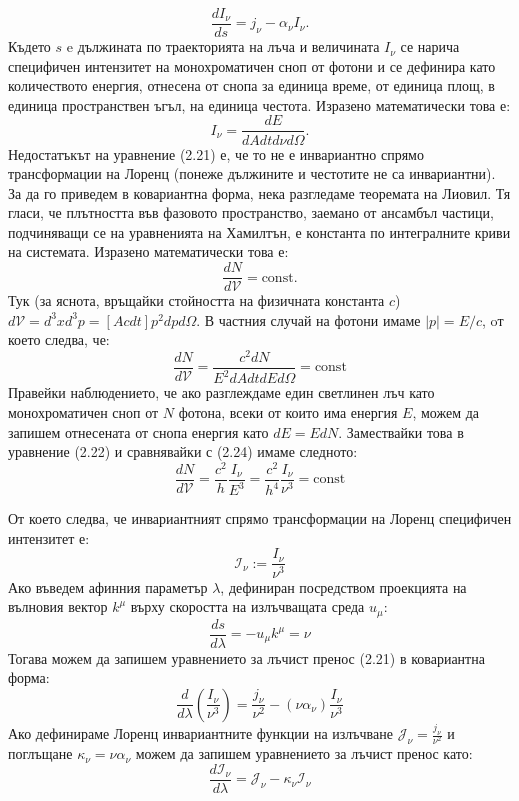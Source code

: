 \begin{equation}
	\frac{dI_\nu}{ds} = j_\nu - \alpha_\nu I_\nu.
\end{equation}
Където $s$ e дължината по траекторията на лъча и величината $I_\nu$ се нарича специфичен интензитет на монохроматичен сноп от фотони и се дефинира като количеството енергия, отнесена от снопа за единица време, от единица площ, в единица пространствен ъгъл, на единица честота. Изразено математически това е:
\begin{equation}
	I_\nu = \frac{dE}{dAdtd\nu d\Omega}.
\end{equation}
Недостатъкът на уравнение (2.21) е, че то не е инвариантно спрямо трансформации на Лоренц (понеже дължините и честотите не са инвариантни). За да го приведем в ковариантна форма, нека разгледаме теоремата на Лиовил. Тя гласи, че плътността във фазовото пространство, заемано от ансамбъл частици, подчиняващи се на уравненията на Хамилтън, е константа по интегралните криви на системата. Изразено математически това е:
\begin{equation}
	\frac{dN}{d\mathcal{V}} = \text{const}.
\end{equation}
Тук (за яснота, връщайки стойността на физичната константа $c$) $d\mathcal{V} = d^3x d^3p = \left[A cdt\right] p^2dpd\Omega$. В частния случай на фотони имаме $|p| = E / c$, oт което следва, че:
\begin{equation}
	\frac{dN}{d\mathcal{V}} = \frac{c^2dN}{E^2dAdtdEd\Omega} = \text{const}
\end{equation}
Правейки наблюдението, че ако разглеждаме един светлинен лъч като монохроматичен сноп от $N$ фотона, всеки от които има енергия $E$, можем да запишем отнесената от снопа енергия като $dE = EdN$. Замествайки това в уравнение (2.22) и сравнявайки с (2.24) имаме следното:
\begin{equation}
	\frac{dN}{d\mathcal{V}} = \frac{c^2}{h}\frac{I_\nu}{E^3} = \frac{c^2}{h^4}\frac{I_\nu}{\nu^3} = \text{const}
\end{equation}

От което следва, че инвариантният спрямо трансформации на Лоренц специфичен интензитет е:
\begin{equation}
	\mathcal{I}_\nu := \frac{I_\nu}{\nu^3}
\end{equation}
Ако въведем афинния параметър $\lambda$, дефиниран посредством проекцията на вълновия вектор $k^\mu$ върху скоростта на излъчващата среда $u_\mu$:
\begin{equation}
	\frac{ds}{d\lambda} = -u_\mu k^\mu = \nu
\end{equation}
Тогава можем да запишем уравнението за лъчист пренос (2.21) в ковариантна форма:
\begin{equation}
	\frac{d}{d\lambda}\left(\frac{I_\nu}{\nu^3}\right) = \frac{j_\nu}{\nu^2} - (\nu\alpha_\nu)\frac{I_\nu}{\nu^3}
\end{equation}
Ако дефинираме Лоренц инвариантните функции на излъчване $\mathcal{J}_\nu = \frac{j_\nu}{\nu^2}$ и поглъщане $\kappa_\nu = \nu\alpha_\nu$ можем да запишем уравнението за лъчист пренос като:
\begin{equation}
	\frac{d\mathcal{I}_\nu}{d\lambda} = \mathcal{J}_\nu - \kappa_\nu\mathcal{I}_\nu
\end{equation}
